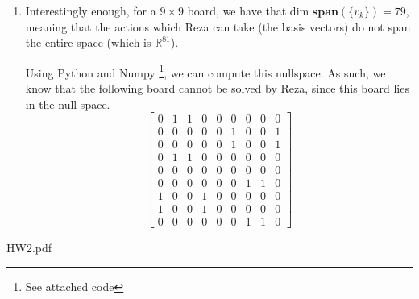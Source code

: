 \documentclass[12pt]{exam}
\begin{document}
\begin{questions}
\begin{solution}
\begin{enumerate}[label=(\alph*)]
      \item Interestingly enough, for a $9 \times 9$ board, we have that $\text{dim }\textbf{span}(\{v_k\}) = 79$, meaning that the actions which Reza can take (the basis vectors) do not span the entire space (which is $\mathbb{R}^{81}$). 

      Using Python and Numpy \footnote{See attached code}, we can compute this nullspace. As such, we know that the following board cannot be solved by Reza, since this board lies in the null-space.
      \[
        \begin{bmatrix}
           0 & 1 & 1 & 0 & 0 & 0 & 0 & 0 & 0 \\
           0 & 0 & 0 & 0 & 0 & 1 & 0 & 0 & 1 \\
           0 & 0 & 0 & 0 & 0 & 1 & 0 & 0 & 1 \\
           0 & 1 & 1 & 0 & 0 & 0 & 0 & 0 & 0 \\
           0 & 0 & 0 & 0 & 0 & 0 & 0 & 0 & 0 \\
           0 & 0 & 0 & 0 & 0 & 0 & 1 & 1 & 0 \\
           1 & 0 & 0 & 1 & 0 & 0 & 0 & 0 & 0 \\
           1 & 0 & 0 & 1 & 0 & 0 & 0 & 0 & 0 \\
           0 & 0 & 0 & 0 & 0 & 0 & 1 & 1 & 0
       \end{bmatrix}
      \]
  \end{enumerate}
\end{solution}


\end{questions}



{HW2.pdf}
\end{document}
